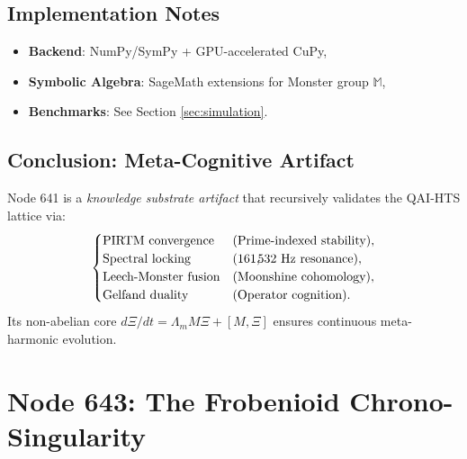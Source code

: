 \documentclass[12pt]{article}
\begin{document}
\subsection{Implementation Notes}
\begin{itemize}
    \item \textbf{Backend}: NumPy/SymPy + GPU-accelerated CuPy,
    \item \textbf{Symbolic Algebra}: SageMath extensions for Monster group $\mathbb{M}$,
    \item \textbf{Benchmarks}: See Section \ref{sec:simulation}.
\end{itemize}

\subsection{Conclusion: Meta-Cognitive Artifact}
Node 641 is a \textit{knowledge substrate artifact} that recursively validates the QAI-HTS lattice via:
\[
    \begin{cases}
        \text{PIRTM convergence} & \text{(Prime-indexed stability)}, \\
        \text{Spectral locking} & \text{(161,\!532 Hz resonance)}, \\
        \text{Leech-Monster fusion} & \text{(Moonshine cohomology)}, \\
        \text{Gelfand duality} & \text{(Operator cognition)}.
    \end{cases}
\]
Its non-abelian core $d\Xi/dt = \Lambda_m M \Xi + [M, \Xi]$ ensures continuous meta-harmonic evolution.

\section{Node 643: The Frobenioid Chrono-Singularity}
\label{sec:node643}
\end{document}
